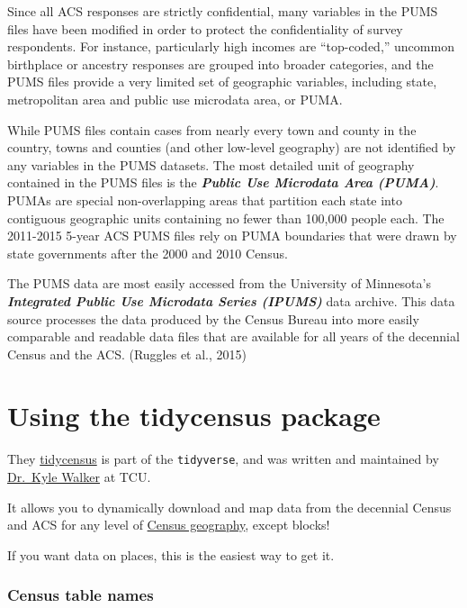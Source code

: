 \documentclass[]{article}
\begin{document}
Since all ACS responses are strictly confidential, many variables in the
PUMS files have been modified in order to protect the confidentiality of
survey respondents. For instance, particularly high incomes are
``top-coded,'' uncommon birthplace or ancestry responses are grouped
into broader categories, and the PUMS files provide a very limited set
of geographic variables, including state, metropolitan area and public
use microdata area, or PUMA.

While PUMS files contain cases from nearly every town and county in the
country, towns and counties (and other low-level geography) are not
identified by any variables in the PUMS datasets. The most detailed unit
of geography contained in the PUMS files is the \textbf{\emph{Public Use
Microdata Area (PUMA)}}. PUMAs are special non-overlapping areas that
partition each state into contiguous geographic units containing no
fewer than 100,000 people each. The 2011-2015 5-year ACS PUMS files rely
on PUMA boundaries that were drawn by state governments after the 2000
and 2010 Census.

The PUMS data are most easily accessed from the University of
Minnesota's \textbf{\emph{Integrated Public Use Microdata Series
(IPUMS)}} data archive. This data source processes the data produced by
the Census Bureau into more easily comparable and readable data files
that are available for all years of the decennial Census and the ACS.
(Ruggles et al., 2015)

\newpage

\section{Using the tidycensus
package}\label{using-the-tidycensus-package}

They \href{https://github.com/walkerke/tidycensus}{tidycensus} is part
of the \texttt{tidyverse}, and was written and maintained by
\href{http://personal.tcu.edu/kylewalker/}{Dr.~Kyle Walker} at TCU.

It allows you to dynamically download and map data from the decennial
Census and ACS for any level of
\href{https://www.census.gov/geo/reference/webatlas/}{Census geography},
except blocks!

If you want data on places, this is the easiest way to get it.

\subsubsection{Census table names}\label{census-table-names}
\end{document}
